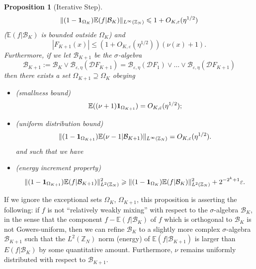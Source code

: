 \documentclass[12pt,a4paper,reqno]{amsart}
\numberwithin{equation}{section}
\theoremstyle{plain}
\newtheorem{proposition}[subsection]{Proposition}
\theoremstyle{definition}
\renewcommand{\leq}{\leqslant}
\renewcommand{\geq}{\geqslant}
\def\B{{\mathcal B}}
\def\D{{\mathcal D}}
\def\Z{{\mathbb Z}}
\def\E{{\mathbb E}}
\def\eps{{\varepsilon}}
\def\vs{\vspace{11pt}}
\def\ni{\noindent}
\def\emph#1{{\it #1}}
\begin{document}
\begin{proposition}[Iterative Step]
\begin{equation}
\| (1 - {\bf 1}_{\Omega_K}) \E(f|\B_K) \|_{L^\infty(\Z_N)} \leq 1 + O_{K,\eps}(\eta^{1/2})
\end{equation}
\textup{(}$\E (f | \B_K)$ is bounded outside $\Omega_K$\textup{)}
and
\begin{equation}\label{f-disc-ok-2}
 |F_{K+1}(x)| \leq (1 + O_{K,\eps}(\eta^{1/2})) (\nu(x) + 1).
\end{equation}
Furthermore, if we let $\B_{K+1}$ be the $\sigma$-algebra
\begin{equation}\label{BK1-def}
 \B_{K+1} := \B_K \vee \B_{\eps,\eta}(\D F_{K+1}) = \B_{\eps,\eta}(\D F_1) \vee \ldots \vee \B_{\eps,\eta}(\D F_{K+1})
\end{equation}
then there exists a set $\Omega_{K+1} \supseteq \Omega_K$ obeying 
\begin{itemize}
\item \textup{(}smallness bound\textup{)}
\begin{equation}\label{om-small-2} \E( (\nu + 1) {\bf 1}_{\Omega_{K+1}} ) = O_{K,\eps}(\eta^{1/2});
\end{equation}
\item \textup{(}uniform distribution bound\textup{)}
\begin{equation}\label{uniform-dist-2}
\| (1 - {\bf 1}_{\Omega_{K+1}}) \E( \nu - 1 | \B_{K+1} )\|_{L^\infty(\Z_N)} = O_{K,\eps}(\eta^{1/2}).
\end{equation}
and such that we have 
\item \textup{(}energy increment property\textup{)}
\begin{equation}\label{fj-increment}
 \| (1 - {\bf 1}_{\Omega_{K+1}}) \E(f|\B_{K+1}) \|_{L^2(\Z_N)}^2 \geq \| (1 - {\bf 1}_{\Omega_K}) \E(f|\B_K) \|_{L^2(\Z_N)}^2 + 2^{-2^k + 1} \eps.
\end{equation}
\end{itemize}
\end{proposition}

\ni\emph{Remark.}  If we ignore the exceptional sets $\Omega_K$, $\Omega_{K+1}$, this proposition is asserting the following: if
$f$ is not ``relatively weakly mixing'' with respect to the $\sigma$-algebra $\B_K$, in the sense that the component $f - \E(f|\B_K)$ of $f$ which is orthogonal to $\B_K$ is not Gowers-uniform, then we can refine $\B_K$ to a slightly more complex $\sigma$-algebra $\B_{K+1}$ such that the $L^2(\Z_N)$ norm (energy) of
$\E(f|\B_{K+1})$ is larger than $E(f|\B_K)$ by some quantitative amount.  Furthermore, $\nu$ remains uniformly distributed with respect to $\B_{K+1}$.\vs
\end{document}
